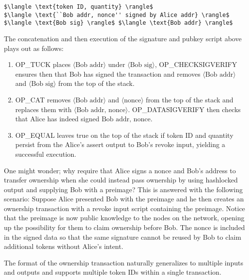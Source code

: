 \documentclass[9pt,oneside]{amsart}
\begin{document}
\begin{lstlisting}[title={\textbf{Bob's Revoke Signature Script}}]
$\langle \text{token ID, quantity} \rangle$ 
$\langle \text{``Bob addr, nonce'' signed by Alice addr} \rangle$ $\langle \text{Bob sig} \rangle$ $\langle \text{Bob addr} \rangle$ 
\end{lstlisting}

The concatenation and then execution of the signature and pubkey script above plays out as follows:
\begin{enumerate}
    \item OP\_TUCK places $\langle \text{Bob addr} \rangle$ under $\langle \text{Bob sig} \rangle$, OP\_CHECKSIGVERIFY ensures then that Bob has signed the transaction and removes $\langle \text{Bob addr} \rangle$ and $\langle \text{Bob sig} \rangle$ from the top of the stack.
    \item OP\_CAT removes $\langle \text{Bob addr} \rangle$ and $\langle \text{nonce} \rangle$ from the top of the stack and replaces them with $\langle \text{Bob addr, nonce} \rangle$. OP\_DATASIGVERIFY then checks that Alice has indeed signed $\text{Bob addr, nonce}$.
    \item OP\_EQUAL leaves true on the top of the stack if token ID and quantity persist from the Alice's assert output to Bob's revoke input, yielding a successful execution.
\end{enumerate}


One might wonder; why require that Alice signs a nonce and Bob's address to transfer ownership when she could instead pass ownership by using hashlocked output and supplying Bob with a preimage? This is answered with the following scenario: Suppose Alice presented Bob with the preimage and he then creates an ownership transaction with a revoke input script containing the preimage. Notice that the preimage is now public knowledge to the nodes on the network, opening up the possibility for them to claim ownership before Bob. The nonce is included in the signed data so that the same signature cannot be reused by Bob to claim additional tokens without Alice's intent.

The format of the ownership transaction naturally generalizes to multiple inputs and outputs and supports multiple token IDs within a single transaction.
\end{document}

